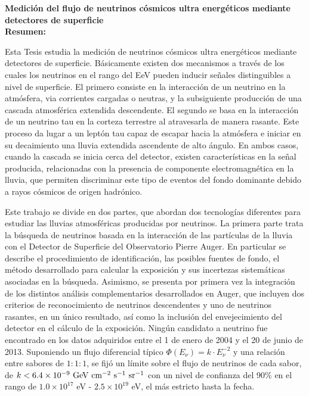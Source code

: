 \begin{titlepage}

$\,$\\[2.5cm]
\textbf{\Large  Medición del flujo de neutrinos cósmicos ultra energéticos mediante detectores de superficie}
$\,$\\[2.5cm]

\noindent
\textbf{Resumen: }

Esta Tesis estudia la medici\'on de neutrinos cósmicos ultra energéticos mediante detectores de superficie.
B\'asicamente existen dos mecanismos a trav\'es de los cuales los neutrinos en el rango del EeV pueden inducir señales distinguibles a nivel de superficie.
El primero consiste en la interacción de un neutrino en la atmósfera, via corrientes cargadas o neutras, y la subsiguiente producci\'on de una cascada atmosférica extendida descendente.
El segundo se basa en la interacción de un neutrino tau en la corteza terrestre al atravesarla de manera rasante.
Este proceso da lugar a un leptón tau capaz de escapar hacia la atmósfera e iniciar en su decaimiento una lluvia extendida ascendente de alto \'angulo.
En ambos casos, cuando la cascada se inicia cerca del detector, existen características en la señal producida, relacionadas con la presencia de componente electromagnética en la lluvia, que permiten discriminar este tipo de eventos del fondo dominante debido a rayos cósmicos de origen hadrónico.

Este trabajo se divide en dos partes, que abordan dos tecnolog\'ias diferentes para estudiar las lluvias atmosf\'ericas producidas por neutrinos.
La primera parte trata la b\'usqueda de neutrinos basada en la interacci\'on de las part\'iculas de la lluvia con el Detector de Superficie del Observatorio Pierre Auger.
En particular se describe el procedimiento de identificaci\'on, las posibles fuentes de fondo, el método desarrollado para calcular la exposición y sus incertezas sistemáticas asociadas en la b\'usqueda.
Asimismo, se presenta por primera vez la integración de los distintos análisis complementarios desarrollados en Auger, que incluyen dos criterios de reconocimiento de neutrinos descendentes y uno de neutrinos rasantes, en un único resultado, as\'i como la inclusión del envejecimiento del detector en el cálculo de la exposición.
Ningún candidato a neutrino fue encontrado en los datos adquiridos entre el 1 de enero de 2004 y el 20 de junio de 2013. Suponiendo un flujo diferencial típico $\Phi(E_\nu) = k\cdot E_\nu^{-2}$ y una relación entre sabores de $1:1:1$, se fijó un límite sobre el flujo de neutrinos de cada sabor, de $k < 6.4 \times 10^{-9}~{\rm GeV~cm^{-2}~s^{-1}~sr^{-1}}$ con un nivel de confianza del 90\% en el rango de ${1.0 \times 10^{17}}$ {eV} - ${2.5 \times 10^{19}}$ {eV}, el m\'as estricto hasta la fecha.


\end{titlepage}
